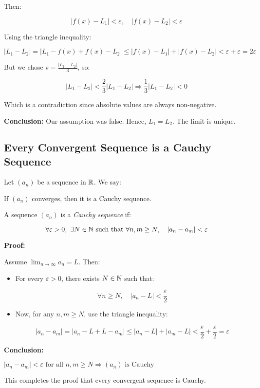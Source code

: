 Then:

\[
    |f(x) - L_1| < \varepsilon, \quad |f(x) - L_2| < \varepsilon
\]

Using the triangle inequality:

\[
    |L_1 - L_2| = |L_1 - f(x) + f(x) - L_2| \le |f(x) - L_1| + |f(x) - L_2| < \varepsilon + \varepsilon = 2\varepsilon
\]

But we chose \( \varepsilon = \frac{|L_1 - L_2|}{3} \), so:

\[
    |L_1 - L_2| < \frac{2}{3}|L_1 - L_2| \Rightarrow \frac{1}{3}|L_1 - L_2| < 0
\]

Which is a contradiction since absolute values are always non-negative.

\textbf{Conclusion:} Our assumption was false. Hence, \( L_1 = L_2 \). The limit is unique.

\QED

\subsection{Every Convergent Sequence is a Cauchy Sequence}

Let \( (a_n) \) be a sequence in \( \mathbb{R} \). We say:

If \( (a_n) \) converges, then it is a Cauchy sequence.

A sequence \( (a_n) \) is a \emph{Cauchy sequence} if:

\[
    \forall \varepsilon > 0, \ \exists N \in \mathbb{N} \text{ such that } \forall n, m \ge N, \quad |a_n - a_m| < \varepsilon
\]

\textbf{Proof:}

Assume \( \lim_{n \to \infty} a_n = L \). Then:

\begin{itemize}

    \item For every \( \varepsilon > 0 \), there exists \( N \in \mathbb{N} \) such that:

    \[
        \forall n \ge N, \quad |a_n - L| < \frac{\varepsilon}{2}
    \]

    \item Now, for any \( n, m \ge N \), use the triangle inequality:

    \[
        |a_n - a_m| = |a_n - L + L - a_m| \le |a_n - L| + |a_m - L| < \frac{\varepsilon}{2} + \frac{\varepsilon}{2} = \varepsilon
    \]

\end{itemize}

\textbf{Conclusion:}  

\(|a_n - a_m| < \varepsilon \text{ for all } n, m \ge N \Rightarrow (a_n) \text{ is Cauchy}\)

This completes the proof that every convergent sequence is Cauchy.

\QED